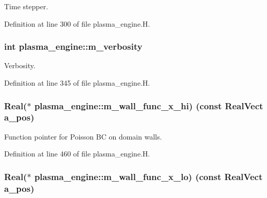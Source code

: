 Time stepper. 



Definition at line 300 of file plasma\+\_\+engine.\+H.

\subsubsection[{\texorpdfstring{m\+\_\+verbosity}{m_verbosity}}]{\setlength{\rightskip}{0pt plus 5cm}int plasma\+\_\+engine\+::m\+\_\+verbosity\hspace{0.3cm}{\ttfamily [protected]}}\hypertarget{classplasma__engine_a763a8e4ae0a147f53b9a42e975ad57bc}{}\label{classplasma__engine_a763a8e4ae0a147f53b9a42e975ad57bc}


Verbosity. 



Definition at line 345 of file plasma\+\_\+engine.\+H.

\subsubsection[{\texorpdfstring{m\+\_\+wall\+\_\+func\+\_\+x\+\_\+hi}{m_wall_func_x_hi}}]{\setlength{\rightskip}{0pt plus 5cm}Real($\ast$ plasma\+\_\+engine\+::m\+\_\+wall\+\_\+func\+\_\+x\+\_\+hi) (const Real\+Vect a\+\_\+pos)\hspace{0.3cm}{\ttfamily [protected]}}\hypertarget{classplasma__engine_a76d3c3e77919786c165e39dafd4b3779}{}\label{classplasma__engine_a76d3c3e77919786c165e39dafd4b3779}


Function pointer for Poisson BC on domain walls. 



Definition at line 460 of file plasma\+\_\+engine.\+H.

\subsubsection[{\texorpdfstring{m\+\_\+wall\+\_\+func\+\_\+x\+\_\+lo}{m_wall_func_x_lo}}]{\setlength{\rightskip}{0pt plus 5cm}Real($\ast$ plasma\+\_\+engine\+::m\+\_\+wall\+\_\+func\+\_\+x\+\_\+lo) (const Real\+Vect a\+\_\+pos)\hspace{0.3cm}{\ttfamily [protected]}}\hypertarget{classplasma__engine_a65dc20ba9e36ce880f4992012280ca06}{}\label{classplasma__engine_a65dc20ba9e36ce880f4992012280ca06}


